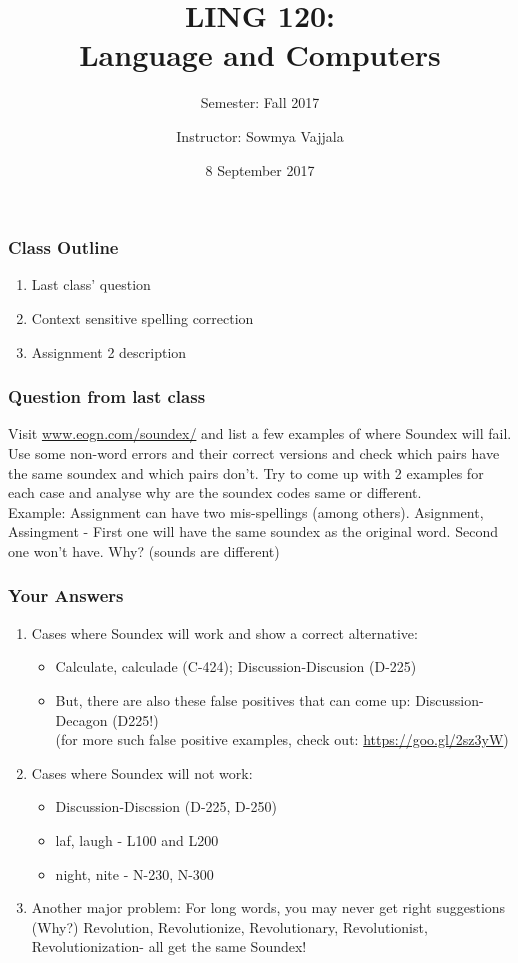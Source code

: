 \documentclass{beamer}
\author[Sowmya Vajjala]{Instructor: Sowmya Vajjala}
\title[LING 120]{LING 120: \\ Language and Computers}
\subtitle{Semester: Fall 2017}
\date{8 September 2017}
\institute{Iowa State University, USA}
\begin{document}
\begin{frame}\titlepage
\end{frame}

\begin{frame}
\frametitle{Class Outline}
\begin{enumerate}
\item Last class' question
\item Context sensitive spelling correction
\item Assignment 2 description
\end{enumerate}
\end{frame}

\begin{frame}
\frametitle{Question from last class}
Visit \url{www.eogn.com/soundex/} and list a few examples of where Soundex will fail. Use some non-word errors and their correct versions and check which pairs have the same soundex and which pairs don't. Try to come up with 2 examples for each case and analyse why are the soundex codes same or different.
\\ Example: Assignment can have two mis-spellings (among others). Asignment, Assingment - First one will have the same soundex as the original word. Second one won't have. Why? (sounds are different)
\end{frame}

\begin{frame}
\frametitle{Your Answers}
\begin{enumerate}
\item Cases where Soundex will work and show a correct alternative:
\begin{itemize}
\item  Calculate, calculade (C-424); Discussion-Discusion (D-225)
\pause \item But, there are also these false positives that can come up: Discussion-Decagon (D225!)
\\ (for more such false positive examples, check out: \url{https://goo.gl/2sz3yW}) 
\end{itemize} \pause
\item Cases where Soundex will not work: 
\begin{itemize}
\item Discussion-Discssion (D-225, D-250)
\item laf, laugh - L100 and L200
\item night, nite - N-230, N-300
\end{itemize}
\item Another major problem: For long words, you may never get right suggestions (Why?) \pause
Revolution, Revolutionize, Revolutionary, Revolutionist, Revolutionization- all get the same Soundex! 
\end{enumerate}
\end{frame}
\end{document}
